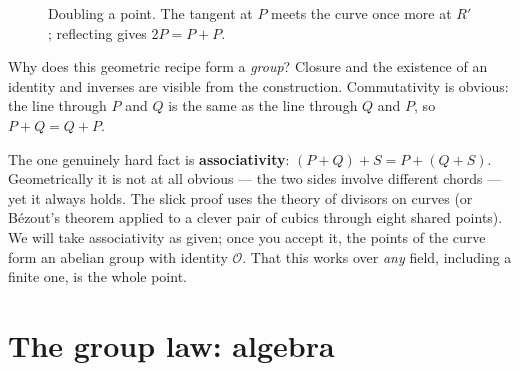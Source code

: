 \begin{figure}[H]
\centering
{}
\caption{Doubling a point. The tangent at $P$ meets the curve once more at $R'$;
reflecting gives $2P = P+P$.}
\label{ch21:doubling-fig}
\end{figure}

\begin{whybox}
Why does this geometric recipe form a \emph{group}? Closure and the existence of an
identity and inverses are visible from the construction. Commutativity is obvious: the
line through $P$ and $Q$ is the same as the line through $Q$ and $P$, so $P+Q=Q+P$.

The one genuinely hard fact is \textbf{associativity}: $(P+Q)+S = P+(Q+S)$. Geometrically
it is not at all obvious --- the two sides involve different chords --- yet it always
holds. The slick proof uses the theory of divisors on curves (or B\'ezout's theorem
applied to a clever pair of cubics through eight shared points). We will take
associativity as given; once you accept it, the points of the curve form an abelian
group with identity $\mathcal{O}$. That this works over \emph{any} field, including a
finite one, is the whole point.
\end{whybox}

\section{The group law: algebra}
\label{ch21:grouplaw-alg}

